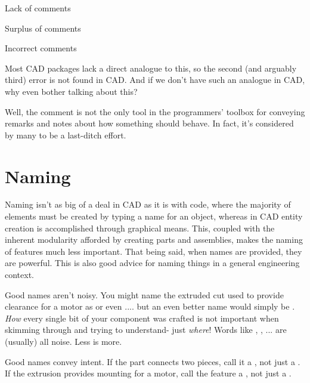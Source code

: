 \begin{asparaenum}[a)]
	\item Lack of comments
	\item Surplus of comments
	\item Incorrect comments
\end{asparaenum}

Most CAD packages lack a direct analogue to this, so the second (and arguably third) error is not found in CAD. And if we don't have such an analogue in CAD, why even bother talking about this?

Well, the comment is not the only tool in the programmers' toolbox for conveying remarks and notes about how something should behave. In fact, it's considered by many to be a last-ditch effort.

\section{Naming}
Naming isn't as big of a deal in CAD as it is with code, where the majority of elements must be created by typing a name for an object, whereas in CAD entity creation is accomplished through graphical means. This, coupled with the inherent modularity afforded by creating parts and assemblies, makes the naming of features much less important. That being said, when names are provided, they are powerful. This is also good advice for naming things in a general engineering context.

Good names aren't noisy. You might name the extruded cut used to provide clearance for a motor as  or even .... but an even better name would simply be . \textit{How} every single bit of your component was crafted is not important when skimming through and trying to understand- just \textit{where}! Words like , , ... are (usually) all noise. Less is more.

Good names convey intent. If the part connects two pieces, call it a , not just a . If the extrusion provides mounting for a motor, call the feature a , not just a .

